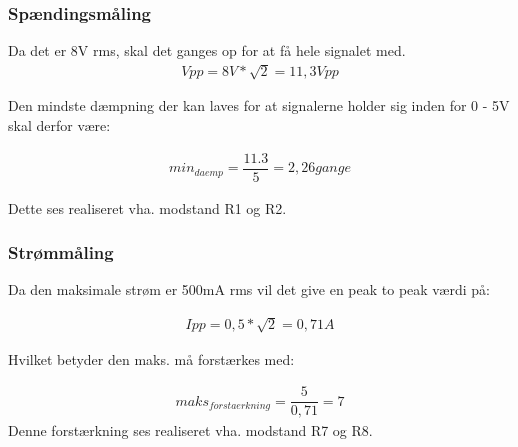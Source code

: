 \subsubsection{Spændingsmåling}
Da det er 8V rms, skal det ganges op for at få hele signalet med.
\begin{align}
Vpp = 8V*\sqrt{2} = 11,3Vpp
\end{align}

Den mindste dæmpning der kan laves for at signalerne holder sig inden for 0 - 5V skal derfor være:

\begin{align}
min_{daemp} = \dfrac{11.3}{5} = 2,26 gange
\end{align}

Dette ses realiseret vha. modstand R1 og R2.

\subsubsection{Strømmåling}

Da  den maksimale strøm er 500mA rms vil det give en peak to peak værdi på:

\begin{align}
Ipp = 0,5*\sqrt{2} = 0,71A
\end{align}

Hvilket betyder den maks. må forstærkes med:

\begin{align}
maks_{forstaerkning} = \dfrac{5}{0,71} = 7
\end{align}
Denne forstærkning ses realiseret vha. modstand R7 og R8.  



 